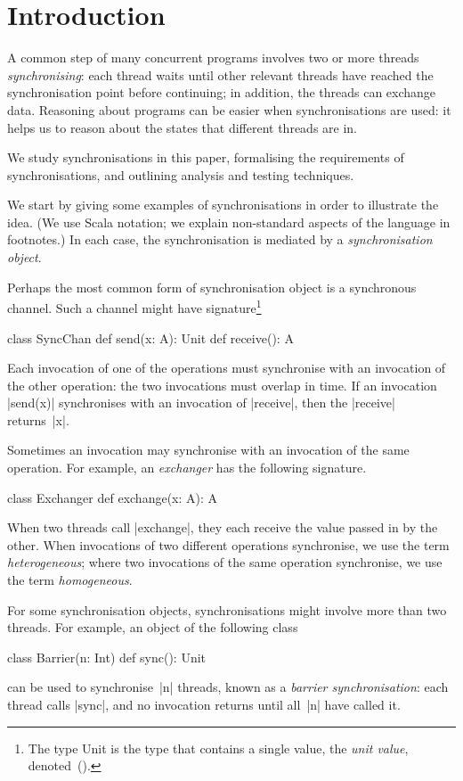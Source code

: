 
\section{Introduction}

A common step of many concurrent programs involves two or more threads
\emph{synchronising}: each thread waits until other relevant threads have
reached the synchronisation point before continuing; in addition, the threads
can exchange data.  Reasoning about programs can be easier when
synchronisations are used: it helps us to reason about the states that
different threads are in. 

We study synchronisations in this paper, formalising the requirements of
synchronisations, and outlining analysis and testing techniques. 

We start by giving some examples of synchronisations in order to illustrate
the idea.  (We use Scala notation; we explain non-standard aspects of the
language in footnotes.)  In each case, the synchronisation is mediated by a
\emph{synchronisation object}.

Perhaps the most common form of synchronisation object is a synchronous
channel.  Such a channel might have signature\footnote{The type {\scalashape
    Unit} is the type that contains a single value, the \emph{unit value},
  denoted~{\scalashape ()}.}
%
\begin{scala}
class SyncChan{
  def send(x: A): Unit
  def receive(): A
}
\end{scala}
%
Each invocation of one of the operations must synchronise with an invocation
of the other operation: the two invocations must overlap in time.  If an
invocation |send(x)| synchronises with an invocation of |receive|, then the
|receive| returns~|x|.

Sometimes an invocation may synchronise with an invocation of the same
operation.  For example, an \emph{exchanger} has the following signature.
%
\begin{scala}
class Exchanger{
  def exchange(x: A): A
}
\end{scala}
%
When two threads call |exchange|, they each receive the value passed in by the
other.  When invocations of two different operations synchronise, we use the
term \emph{heterogeneous}; where two invocations of the same operation
synchronise, we use the term \emph{homogeneous}.  

For some synchronisation objects, synchronisations might involve more than two
threads.  For example, an object of the following class
%
\begin{scala}
class Barrier(n: Int){
  def sync(): Unit
}
\end{scala}
%
can be used to synchronise~|n| threads, known as a \emph{barrier
  synchronisation}: each thread calls |sync|, and no invocation returns until
all~|n| have called it.

